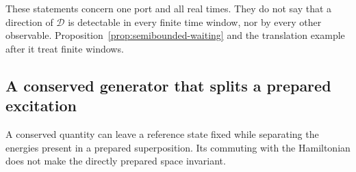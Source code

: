These statements concern one port and all real times. They do not say that a direction of $\mathcal D$ is detectable in every finite time window, nor by every other observable. Proposition~\ref{prop:semibounded-waiting} and the translation example after it treat finite windows.

\subsection{A conserved generator that splits a prepared excitation}
\label{subsec:passive-sectors}

A conserved quantity can leave a reference state fixed while separating the energies present in a prepared superposition. Its commuting with the Hamiltonian does not make the directly prepared space invariant.

